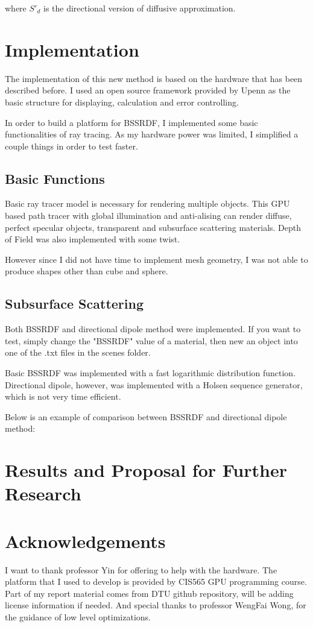 \documentclass[11pt]{article}
\begin{document}
where $S'_d$ is the directional version of diffusive approximation.


\section{Implementation}
\label{sec:orgheadline7}
The implementation of this new method is based on the hardware that has been described before. 
I used an open source  framework provided by Upenn as the basic structure for displaying, calculation 
and error controlling. 

In order to build a platform for BSSRDF, I implemented some basic functionalities of ray tracing. As my hardware power was limited, 
I simplified a couple things in order to test faster. 
\subsection{Basic Functions}
\label{sec:orgheadline5}
Basic ray tracer model is necessary for rendering multiple objects. This GPU based path tracer with global illumination and anti-alising 
can render diffuse, perfect specular objects, transparent and subsurface scattering materials. Depth of Field was also implemented 
with some twist.

However since I did not have time to implement mesh geometry, I was not able to produce shapes other than cube and sphere.  
\subsection{Subsurface Scattering}
\label{sec:orgheadline6}
Both BSSRDF and directional dipole method were implemented. If you want to test, simply change the "BSSRDF" value of a material, then new an object into 
one of the .txt files in the scenes folder. 

Basic BSSRDF was implemented with a fast logarithmic distribution function. Directional dipole, however, was implemented with a 
Holsen sequence  generator, which is not very time efficient.

Below is an example of comparison between BSSRDF and directional dipole method:

\section{Results and Proposal for Further Research}
\label{sec:orgheadline8}



\section{Acknowledgements}
\label{sec:orgheadline9}
I want to thank professor Yin for offering to help with the hardware. 
The platform  that I used to develop is provided by CIS565 GPU programming course. 
Part of my report material comes from DTU github repository, will be adding license information if needed.
And special thanks to professor WengFai Wong, for the guidance of low level optimizations. 
\end{document}
